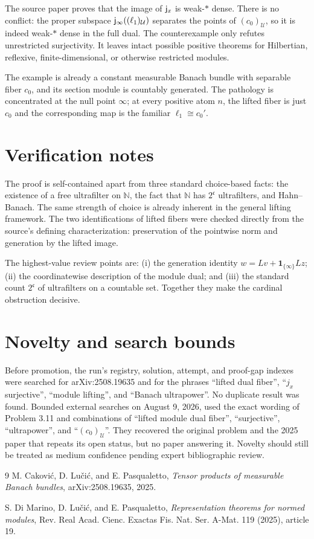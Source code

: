 \documentclass[11pt]{amsart}
\newcommand{\N}{\mathbb N}
\newcommand{\U}{\mathcal U}
\begin{document}
The source paper proves that the image of ${\sf j}_x$ is weak-$*$ dense.
There is no conflict: the proper subspace
${\sf j}_\infty((\ell_1)_\U)$ separates the points of $(c_0)_\U$, so it is
indeed weak-$*$ dense in the full dual.  The counterexample only refutes
unrestricted surjectivity.  It leaves intact possible positive theorems for
Hilbertian, reflexive, finite-dimensional, or otherwise restricted modules.

The example is already a constant measurable Banach bundle with separable
fiber $c_0$, and its section module is countably generated.  The pathology is
concentrated at the null point $\infty$; at every positive atom $n$, the
lifted fiber is just $c_0$ and the corresponding map is the familiar
$\ell_1\cong c_0'$.

\section*{Verification notes}

The proof is self-contained apart from three standard choice-based facts:
the existence of a free ultrafilter on $\N$, the fact that $\N$ has
$2^{\mathfrak c}$ ultrafilters, and Hahn--Banach.  The same strength of choice
is already inherent in the general lifting framework.  The two identifications
of lifted fibers were checked directly from the source's defining
characterization: preservation of the pointwise norm and generation by the
lifted image.

The highest-value review points are: (i) the generation identity
$w=Lv+\mathbf1_{\{\infty\}}Lz$; (ii) the coordinatewise description of the
module dual; and (iii) the standard count $2^{\mathfrak c}$ of ultrafilters
on a countable set.  Together they make the cardinal obstruction decisive.

\section*{Novelty and search bounds}

Before promotion, the run's registry, solution, attempt, and proof-gap
indexes were searched for arXiv:2508.19635 and for the phrases ``lifted dual
fiber'', ``$j_x$ surjective'', ``module lifting'', and ``Banach ultrapower''.
No duplicate result was found.  Bounded external searches on August 9, 2026,
used the exact wording of Problem 3.11 and combinations of
``lifted module dual fiber'', ``surjective'', ``ultrapower'', and
``$(c_0)_\mathcal U$''.  They recovered the original problem and the 2025
paper that repeats its open status, but no paper answering it.  Novelty should
still be treated as medium confidence pending expert bibliographic review.

\begin{thebibliography}{9}
M. Cakovi\'c, D. Lu\v{c}i\'c, and E. Pasqualetto,
\emph{Tensor products of measurable Banach bundles},
arXiv:2508.19635, 2025.

S. Di Marino, D. Lu\v{c}i\'c, and E. Pasqualetto,
\emph{Representation theorems for normed modules},
Rev. Real Acad. Cienc. Exactas Fis. Nat. Ser. A-Mat. 119 (2025), article 19.
\end{thebibliography}
\end{document}
